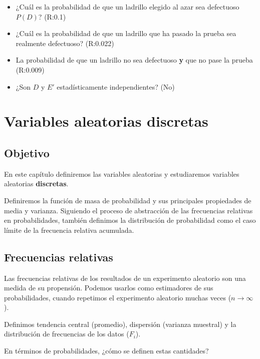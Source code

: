 \documentclass[
]{book}
\begin{document}
\begin{itemize}
\item
  ¿Cuál es la probabilidad de que un ladrillo elegido al azar sea defectuoso \(P(D)\)? (R:0.1)
\item
  ¿Cuál es la probabilidad de que un ladrillo que ha pasado la prueba sea realmente defectuoso? (R:0.022)
\item
  La probabilidad de que un ladrillo no sea defectuoso \textbf{y} que no pase la prueba (R:0.009)
\item
  ¿Son \(D\) y \(E'\) estadísticamente independientes? (No)
\end{itemize}

\hypertarget{variables-aleatorias-discretas}{%
\chapter{Variables aleatorias discretas}\label{variables-aleatorias-discretas}}

\hypertarget{objetivo-1}{%
\section{Objetivo}\label{objetivo-1}}

En este capítulo definiremos las variables aleatorias y estudiaremos variables aleatorias \textbf{discretas}.

Definiremos la función de masa de probabilidad y sus principales propiedades de media y varianza. Siguiendo el proceso de abstracción de las frecuencias relativas en probabilidades, también definimos la distribución de probabilidad como el caso límite de la frecuencia relativa acumulada.

\hypertarget{frecuencias-relativas-2}{%
\section{Frecuencias relativas}\label{frecuencias-relativas-2}}

Las frecuencias relativas de los resultados de un experimento aleatorio son una medida de su propensión. Podemos usarlos como estimadores de sus probabilidades, cuando repetimos el experimento aleatorio muchas veces (\(n \rightarrow \infty\)).

Definimos tendencia central (promedio), dispersión (varianza muestral) y la distribución de frecuencias de los datos (\(F_i\)).

En términos de probabilidades, ¿cómo se definen estas cantidades?
\end{document}
